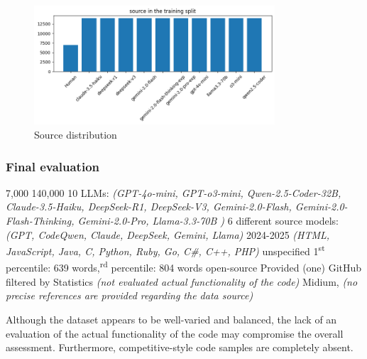 \begin{figure}[H]
    \centering
    \includegraphics[width=0.8\textwidth]{img/CodeMirage/source.png}
    \caption{Source distribution}
    \label{fig:distribution}
\end{figure}

\subsubsection*{Final evaluation}


\expandafter\def\csname CodeMirageHumanCode\endcsname{7,000}
\expandafter\def\csname CodeMirageLLMCode\endcsname{140,000}
\expandafter\def\csname CodeMirageNumLLMs\endcsname{10 LLMs: \textit{(GPT-4o-mini, GPT-o3-mini, Qwen-2.5-Coder-32B, Claude-3.5-Haiku, DeepSeek-R1, DeepSeek-V3,  Gemini-2.0-Flash,  Gemini-2.0-Flash-Thinking, Gemini-2.0-Pro, Llama-3.3-70B )}}
\expandafter\def\csname CodeMirageLLMDiversity\endcsname{6 different source models: \textit{(GPT, CodeQwen, Claude, DeepSeek, Gemini, Llama) }}
\expandafter\def\csname CodeMirageCurrentUse\endcsname{2024-2025}
\expandafter\def\csname CodeMirageLanguages\endcsname{\textit{(HTML, JavaScript, Java, C, Python, Ruby, Go, C\#, C++, PHP)}}
\expandafter\def\csname CodeMirageCodeTypes\endcsname{unspecified}
\expandafter\def\csname CodeMirageCodeSize\endcsname{1\textsuperscript{st} percentile: 639 words,\textsuperscript{rd} percentile: 804  words}
\expandafter\def\csname CodeMirageCodeContext\endcsname{open-source}
\expandafter\def\csname CodeMiragePrompts\endcsname{Provided (one)}
\expandafter\def\csname CodeMirageSources\endcsname{GitHub}
\expandafter\def\csname CodeMirageCodeQuality\endcsname{filtered by Statistics \textit{(not evaluated actual functionality of the code)}}
\expandafter\def\csname CodeMirageReliability\endcsname{Midium, \textit{(no precise references are provided regarding the data source)}}




Although the dataset appears to be well-varied and balanced, 
the lack of an evaluation of the actual functionality of the code 
may compromise the overall assessment. Furthermore, 
competitive-style code samples are completely absent.